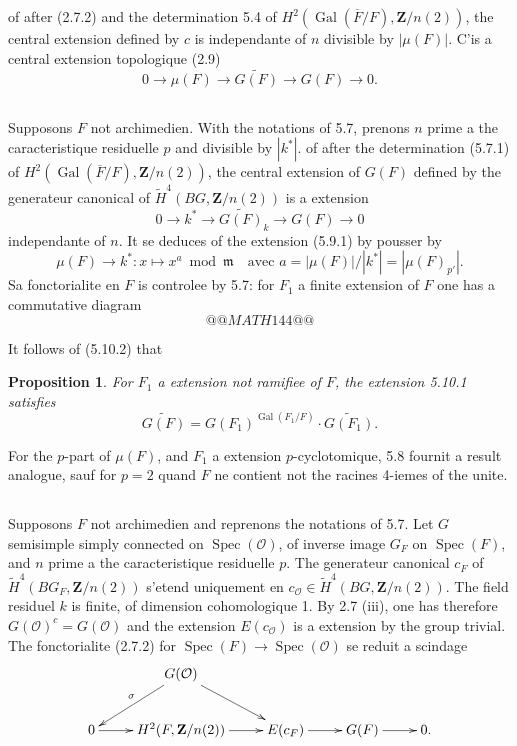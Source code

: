 \documentclass[11pt,a4paper]{article}
\theoremstyle{plain}
\newtheorem{proposition}[theorem]{Proposition}
\theoremstyle{definition}
\DeclareMathOperator{\Gal}{Gal}
\DeclareMathOperator{\Spec}{Spec}
\begin{document}
of after (2.7.2) and the determination 5.4 of $H^2(\Gal(\overline{F}/F), \mathbf{Z}/n(2))$, the central extension defined by $c$ is independante of $n$ divisible by $|\mu(F)|$. C'is a central extension topologique (2.9)
\begin{equation}\label{5.9.1}
0 \to \mu(F) \to \widetilde{G(F)} \to G(F) \to 0.
\end{equation}

\subsection{}\label{5.10}

Supposons $F$ not archimedien. With the notations of 5.7, prenons $n$ prime a the caracteristique residuelle $p$ and divisible by $|k^*|$. of after the determination (5.7.1) of $H^2(\Gal(\overline{F}/F), \mathbf{Z}/n(2))$, the central extension of $G(F)$ defined by the generateur canonical of $\widetilde{H}^4(BG, \mathbf{Z}/n(2))$ is a extension
\begin{equation}\label{5.10.1}
0 \to k^* \to \widetilde{G(F)}_k \to G(F) \to 0
\end{equation}
independante of $n$. It se deduces of the extension (5.9.1) by pousser by
\[
\mu(F) \to k^* : x \mapsto x^a \bmod{\mathfrak{m}} \quad \text{avec } a = |\mu(F)|/|k^*| = |\mu(F)_{p'}|.
\]
Sa fonctorialite en $F$ is controlee by 5.7: for $F_1$ a finite extension of $F$ one has a commutative diagram
\[
@@MATH144@@
\]

It follows of (5.10.2) that
\begin{proposition}\label{5.11}
For $F_1$ a extension not ramifiee of $F$, the extension 5.10.1 satisfies
\[
\widetilde{G(F)} = G(F_1)^{\Gal(F_1/F)} \cdot \widetilde{G(F_1)}.
\]
\end{proposition}

For the $p$-part of $\mu(F)$, and $F_1$ a extension $p$-cyclotomique, 5.8 fournit a result analogue, sauf for $p = 2$ quand $F$ ne contient not the racines 4-iemes of the unite.

\subsection{}\label{5.12}

Supposons $F$ not archimedien and reprenons the notations of 5.7. Let $G$ semisimple simply connected on $\Spec(\mathcal{O})$, of inverse image $G_F$ on $\Spec(F)$, and $n$ prime a the caracteristique residuelle $p$. The generateur canonical $c_F$ of $\widetilde{H}^4(BG_F, \mathbf{Z}/n(2))$ s'etend uniquement en $c_{\mathcal{O}} \in \widetilde{H}^4(BG, \mathbf{Z}/n(2))$. The field residuel $k$ is finite, of dimension cohomologique 1. By 2.7 (iii), one has therefore $G(\mathcal{O})^c = G(\mathcal{O})$ and the extension $E(c_{\mathcal{O}})$ is a extension by the group trivial. The fonctorialite (2.7.2) for $\Spec(F) \to \Spec(\mathcal{O})$ se reduit a scindage
\[
\xymatrix{
& G(\mathcal{O}) \ar[dl]_{\sigma} \ar[dr] & \\
0 \ar[r] & H^2(F, \mathbf{Z}/n(2)) \ar[r] & E(c_F) \ar[r] & G(F) \ar[r] & 0.
}
\]
\end{document}
